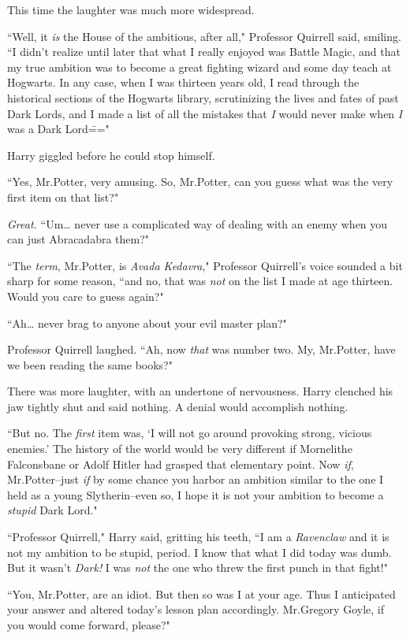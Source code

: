 This time the laughter was much more widespread.

``Well, it \emph{is} the House of the ambitious, after all," Professor Quirrell said, smiling. ``I didn't realize until later that what I really enjoyed was Battle Magic, and that my true ambition was to become a great fighting wizard and some day teach at Hogwarts. In any case, when I was thirteen years old, I read through the historical sections of the Hogwarts library, scrutinizing the lives and fates of past Dark Lords, and I made a list of all the mistakes that \emph{I} would never make when \emph{I} was a Dark Lord\==="

Harry giggled before he could stop himself.

``Yes, Mr.\?Potter, very amusing. So, Mr.\?Potter, can you guess what was the very first item on that list?"

\emph{Great.} ``Um{\ldots} never use a complicated way of dealing with an enemy when you can just Abracadabra them?"

``The \emph{term}, Mr.\?Potter, is \emph{Avada Kedavra}," Professor Quirrell's voice sounded a bit sharp for some reason, ``and no, that was \emph{not} on the list I made at age thirteen. Would you care to guess again?"

``Ah{\ldots} never brag to anyone about your evil master plan?"

Professor Quirrell laughed. ``Ah, now \emph{that} was number two. My, Mr.\?Potter, have we been reading the same books?"

There was more laughter, with an undertone of nervousness. Harry clenched his jaw tightly shut and said nothing. A denial would accomplish nothing.

``But no. The \emph{first} item was, `I will not go around provoking strong, vicious enemies.' The history of the world would be very different if Mornelithe Falconsbane or Adolf Hitler had grasped that elementary point. Now \emph{if}, Mr.\?Potter\---just \emph{if} by some chance you harbor an ambition similar to the one I held as a young Slytherin\---even so, I hope it is not your ambition to become a \emph{stupid} Dark Lord."

``Professor Quirrell," Harry said, gritting his teeth, ``I am a \emph{Ravenclaw} and it is not my ambition to be stupid, period. I know that what I did today was dumb. But it wasn't \emph{Dark!} I was \emph{not} the one who threw the first punch in that fight!"

``You, Mr.\?Potter, are an idiot. But then so was I at your age. Thus I anticipated your answer and altered today's lesson plan accordingly. Mr.\?Gregory Goyle, if you would come forward, please?"

